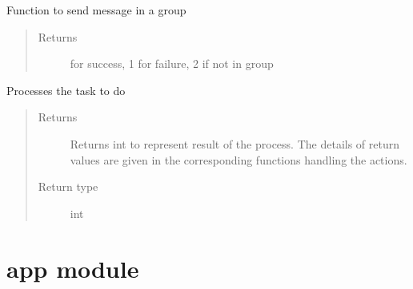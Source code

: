 \documentclass[letterpaper,10pt,english]{sphinxmanual}
\begin{document}
\begin{fulllineitems}
\begin{fulllineitems}
\end{fulllineitems}


\begin{fulllineitems}
\label{\detokenize{Message:Message.Message._send_message_in_group}}
Function to send message in a group
\begin{quote}\begin{description}
\item[{Returns}]  for success, 1 for failure, 2 if not in group

\end{description}\end{quote}

\end{fulllineitems}


\begin{fulllineitems}
\label{\detokenize{Message:Message.Message.processTask}}
Processes the task to do
\begin{quote}\begin{description}
\item[{Returns}] \leavevmode
Returns int to represent result of the process. The details of return values are given in the corresponding functions handling the actions.

\item[{Return type}] \leavevmode
int

\end{description}\end{quote}

\end{fulllineitems}


\end{fulllineitems}



\section{app module}
\label{\detokenize{app:module-app}}\label{\detokenize{app:app-module}}\label{\detokenize{app::doc}}
\end{document}
